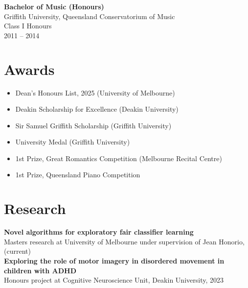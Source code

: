 \documentclass[a4paper,10pt]{article}
\begin{document}
\noindent\textbf{Bachelor of Music (Honours)} \\
Griffith University, Queensland Conservatorium of Music \\
Class I Honours \\
2011 -- 2014





\section*{\Large Awards}
\begin{itemize}
    \item Dean's Honours List, 2025 (University of Melbourne)
    \item Deakin Scholarship for Excellence (Deakin University)
    \item Sir Samuel Griffith Scholarship (Griffith University)
    \item University Medal (Griffith University)
    \item 1st Prize, Great Romantics Competition (Melbourne Recital Centre)
    \item 1st Prize, Queensland Piano Competition
\end{itemize}


\section*{\Large Research}
\noindent\textbf{Novel algorithms for exploratory fair classifier learning} \\
Masters research at University of Melbourne under supervision of Jean Honorio, (current) \\


\noindent\textbf{Exploring the role of motor imagery in disordered movement in children with ADHD} \\
Honours project at Cognitive Neuroscience Unit, Deakin University, 2023 \\
\end{document}
